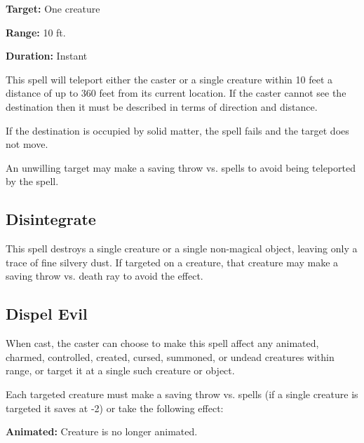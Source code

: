 \begin{multicols*}{2}
{\textbf{Target:} One creature

\textbf{Range:} 10 ft.

\textbf{Duration:} Instant}

This spell will teleport either the caster or a single creature within 10 feet a distance of up to 360 feet from its current location. If the caster cannot see the destination then it must be described in terms of direction and distance.

If the destination is occupied by solid matter, the spell fails and the target does not move.

An unwilling target may make a saving throw vs. spells to avoid being teleported by the spell.

\subsection{Disintegrate}\label{spell:Disintegrate}

This spell destroys a single creature or a single non-magical object, leaving only a trace of fine silvery dust. If targeted on a creature, that creature may make a saving throw vs. death ray to avoid the effect.

\subsection{Dispel Evil}\label{spell:Dispel Evil}

When cast, the caster can choose to make this spell affect any animated, charmed, controlled, created, cursed, summoned, or undead creatures within range, or target it at a single such creature or object.

Each targeted creature must make a saving throw vs. spells (if a single creature is targeted it saves at -2) or take the following effect:

\textbf{Animated:} Creature is no longer animated.


\end{multicols*}
